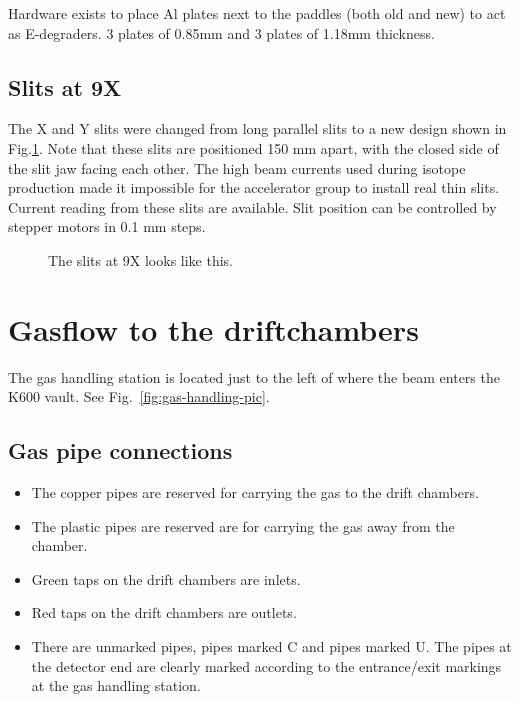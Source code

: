 \documentclass[11pt]{report}
\begin{document}
Hardware exists to place Al plates next to the paddles (both old and new)
to act as E-degraders. 3 plates of 0.85mm and 3 plates of 1.18mm thickness.

\section{Slits at 9X}

The X and Y slits were changed from long parallel slits to a new design
shown in Fig.\ref{fig:thinslit}.  Note that these slits are positioned 150 mm apart, with
the closed side of the slit jaw facing each other.
The high beam currents used during isotope production
made it impossible for the accelerator group to install real thin slits.
Current reading from these slits are available.
Slit position can be controlled by stepper motors in 0.1 mm steps.


\begin{figure}[!ht]
\centerline{\vspace{0cm}\hspace{0cm}
}
\centering
\caption{The slits at 9X looks like this.}
\label{fig:thinslit}
\end{figure} 





\clearpage










\chapter{Gasflow to the driftchambers}

The gas handling station is located just to the left of where the
beam enters the K600 vault.
See Fig.~\ref{fig:gas-handling-pic}.


\section{Gas pipe connections}
\begin{itemize}
\item The copper pipes are reserved for carrying the gas to the drift chambers. 
\item The plastic pipes are reserved are for carrying the gas away from the chamber.
\item Green taps on the drift chambers are inlets.
\item Red taps on the drift chambers are outlets.
\item There are unmarked pipes, pipes marked C and pipes marked U. The pipes at the
detector end are clearly marked according to the entrance/exit markings at the gas handling station.
\end{itemize}
\end{document}
